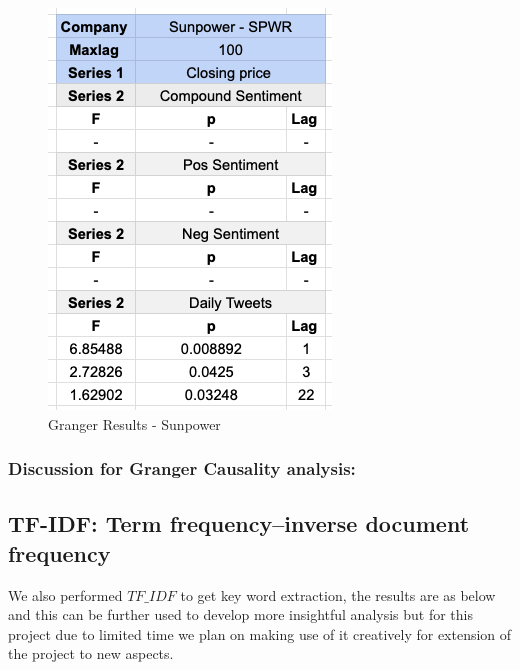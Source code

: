 \documentclass[sigconf, nonacm]{acmart}
\begin{document}
\begin{figure}[H]
  \centering
  \includegraphics[width=0.4\linewidth]{granger_results/granger_sunpower.png}
  \caption{Granger Results - Sunpower}
  \label{granger_sunpower}
\end{figure}


\subsubsection{Discussion for Granger Causality analysis:}

\subsection{TF-IDF: Term frequency–inverse document frequency} 
We also performed $TF\_IDF$ to get key word extraction, the results are as below and this can be further used to develop more insightful analysis but for this project due to limited time we plan on making use of it creatively for extension of the project to new aspects.
\end{document}
